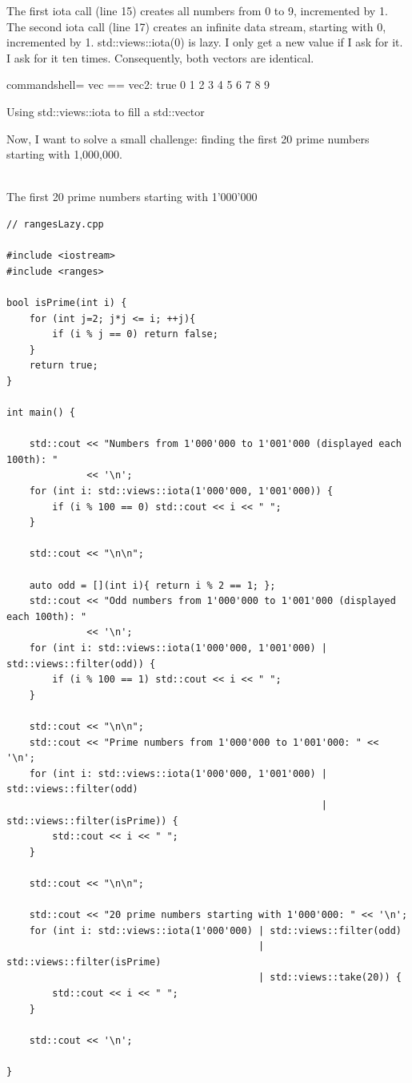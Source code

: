 The first iota call (line 15) creates all numbers from 0 to 9, incremented by 1. The second iota call (line 17) creates an infinite data stream, starting with 0, incremented by 1. std::views::iota(0) is lazy. I only get a new value if I ask for it. I ask for it ten times. Consequently, both vectors are identical.

\begin{tcblisting}{commandshell={}}
vec == vec2: true
0 1 2 3 4 5 6 7 8 9
\end{tcblisting}

\begin{center}
Using std::views::iota to fill a std::vector
\end{center}

Now, I want to solve a small challenge: finding the first 20 prime numbers starting with 1,000,000.

\hspace*{\fill} \\ %
\noindent
The first 20 prime numbers starting with 1’000’000
\begin{lstlisting}[style=styleCXX]
// rangesLazy.cpp

#include <iostream>
#include <ranges>

bool isPrime(int i) {
	for (int j=2; j*j <= i; ++j){
		if (i % j == 0) return false;
	}
	return true;
}

int main() {
	
	std::cout << "Numbers from 1'000'000 to 1'001'000 (displayed each 100th): "
	          << '\n';
	for (int i: std::views::iota(1'000'000, 1'001'000)) {
		if (i % 100 == 0) std::cout << i << " ";
	}
	
	std::cout << "\n\n";
	
	auto odd = [](int i){ return i % 2 == 1; };
	std::cout << "Odd numbers from 1'000'000 to 1'001'000 (displayed each 100th): "
	          << '\n';
	for (int i: std::views::iota(1'000'000, 1'001'000) | std::views::filter(odd)) {
		if (i % 100 == 1) std::cout << i << " ";
	}
	
	std::cout << "\n\n";
	std::cout << "Prime numbers from 1'000'000 to 1'001'000: " << '\n';
	for (int i: std::views::iota(1'000'000, 1'001'000) | std::views::filter(odd)
	                                                   | std::views::filter(isPrime)) {
		std::cout << i << " ";
	}
	
	std::cout << "\n\n";
	
	std::cout << "20 prime numbers starting with 1'000'000: " << '\n';
	for (int i: std::views::iota(1'000'000) | std::views::filter(odd)
	                                        | std::views::filter(isPrime)
	                                        | std::views::take(20)) {
		std::cout << i << " ";
	}
	
	std::cout << '\n';

}
\end{lstlisting}

